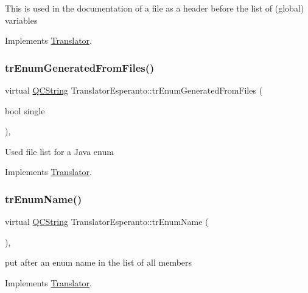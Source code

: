 This is used in the documentation of a file as a header before the list of (global) variables 

Implements \mbox{\hyperlink{class_translator}{Translator}}.

\mbox{\label{class_translator_esperanto_abf13ca341f52a58c933d7fd8450dc1ad}} 
\subsubsection{\texorpdfstring{trEnumGeneratedFromFiles()}{trEnumGeneratedFromFiles()}}
{\footnotesize\ttfamily virtual \mbox{\hyperlink{class_q_c_string}{Q\+C\+String}} Translator\+Esperanto\+::tr\+Enum\+Generated\+From\+Files (\begin{DoxyParamCaption}\item[{bool}]{single }\end{DoxyParamCaption})\hspace{0.3cm}{\ttfamily [inline]}, {\ttfamily [virtual]}}

Used file list for a Java enum 

Implements \mbox{\hyperlink{class_translator}{Translator}}.

\mbox{\label{class_translator_esperanto_a9a80623f29d15788da50f7565accf638}} 
\subsubsection{\texorpdfstring{trEnumName()}{trEnumName()}}
{\footnotesize\ttfamily virtual \mbox{\hyperlink{class_q_c_string}{Q\+C\+String}} Translator\+Esperanto\+::tr\+Enum\+Name (\begin{DoxyParamCaption}{ }\end{DoxyParamCaption})\hspace{0.3cm}{\ttfamily [inline]}, {\ttfamily [virtual]}}

put after an enum name in the list of all members 

Implements \mbox{\hyperlink{class_translator}{Translator}}.

\mbox{\label{class_translator_esperanto_a506e838aeb61d235bd6571ffcc2d1804}} 
